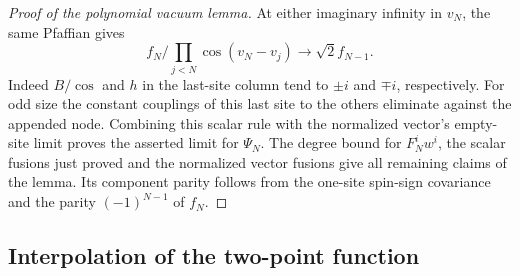 \begin{proof}[Proof of the polynomial vacuum lemma]
At either imaginary infinity in \(v_N\), the same Pfaffian gives
\[
 f_N/\prod_{j<N}\cos(v_N-v_j)\longrightarrow\sqrt2 f_{N-1}.
\]
Indeed \(B/\cos\) and \(h\) in the last-site column tend to \(\pm i\) and \(\mp i\), respectively. For odd size the constant couplings of this last site to the others eliminate against the appended node. Combining this scalar rule with the normalized vector's empty-site limit proves the asserted limit for \(\Psi_N\). The degree bound for \(F_N^iw^i\), the scalar fusions just proved and the normalized vector fusions give all remaining claims of the lemma. Its component parity follows from the one-site spin-sign covariance and the parity \((-1)^{N-1}\) of \(f_N\).
\end{proof}

\subsection{Interpolation of the two-point function}\label{c6:subheading-07}

